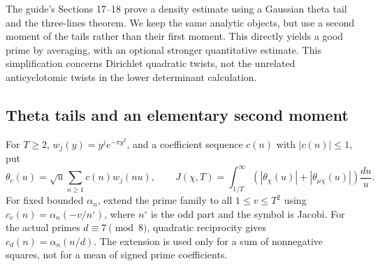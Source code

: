 \documentclass[11pt,a4paper]{article}
\theoremstyle{remark}\newtheorem{remark}[theorem]{Remark}
\begin{document}
The guide's Sections 17--18 prove a density estimate using a Gaussian theta tail and the three-lines theorem. We keep the same analytic objects, but use a second moment of the tails rather than their first moment. This directly yields a good prime by averaging, with an optional stronger quantitative estimate. This simplification concerns Dirichlet quadratic twists, not the unrelated anticyclotomic twists in the lower determinant calculation.

\subsection{Theta tails and an elementary second moment}
For $T\ge2$, $w_j(y)=y^j e^{-\pi y^2}$, and a coefficient sequence $c(n)$ with $|c(n)|\le1$, put
\[\theta_c(u)=\sqrt u\sum_{n\ge1}c(n)w_j(nu),\qquad
J(\chi,T)=\int_{1/T}^{\infty}(|\theta_\chi(u)|+|\theta_{\mu\chi}(u)|)\frac{du}{u}.
\]
For fixed bounded $\alpha_n$, extend the prime family to all $1\le v\le T^2$ using $c_v(n)=\alpha_n(-v/n^\circ)$, where $n^\circ$ is the odd part and the symbol is Jacobi. For the actual primes $d\equiv7\pmod8$, quadratic reciprocity gives $c_d(n)=\alpha_n(n/d)$. The extension is used only for a sum of nonnegative squares, not for a mean of signed prime coefficients.
\end{document}
